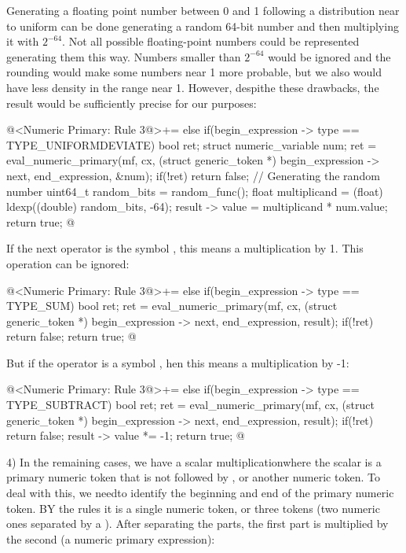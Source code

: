 Generating a floating point number between 0 and 1 following a
distribution near to uniform can be done generating a random 64-bit
number and then multiplying it with $2^{-64}$. Not all possible
floating-point numbers could be represented generating them this
way. Numbers smaller than $2^{-64}$ would be ignored and the rounding
would make some numbers near 1 more probable, but we also would have
less density in the range near 1. However, despithe these drawbacks,
the result would be sufficiently precise for our purposes:

\iniciocodigo
@<Numeric Primary: Rule 3@>+=
else if(begin_expression -> type == TYPE_UNIFORMDEVIATE){
  bool ret;
  struct numeric_variable num;
  ret = eval_numeric_primary(mf, cx, (struct generic_token *)
                             begin_expression -> next,
                             end_expression, &num);
  if(!ret)
    return false;
  { // Generating the random number
    uint64_t random_bits = random_func();
    float multiplicand = (float) ldexp((double) random_bits, -64);
    result -> value = multiplicand * num.value;
  }
  return true;
}
@
\fimcodigo

If the next operator is the symbol \monoespaco{+}, this means a
multiplication by 1. This operation can be ignored:

\iniciocodigo
@<Numeric Primary: Rule 3@>+=
else if(begin_expression -> type == TYPE_SUM){
  bool ret;
  ret = eval_numeric_primary(mf, cx, (struct generic_token *)
                             begin_expression -> next,
                             end_expression, result);
  if(!ret)
    return false;
  return true;
}
@
\fimcodigo

But if the operator is a symbol \monoespaco{-}, hen this means a
multiplication by -1:

\iniciocodigo
@<Numeric Primary: Rule 3@>+=
else if(begin_expression -> type == TYPE_SUBTRACT){
  bool ret;
  ret = eval_numeric_primary(mf, cx, (struct generic_token *)
                             begin_expression -> next,
                             end_expression, result);
  if(!ret)
    return false;
  result -> value *= -1;
  return true;
}
@
\fimcodigo

4) In the remaining cases, we have a scalar multiplicationwhere the
scalar is a primary numeric token that is not followed
by \monoespaco{+}, \monoespaco{-} or another numeric token. To deal
with this, we needto identify the beginning and end of the primary
numeric token. BY the rules it is a single numeric token, or three
tokens (two numeric ones separated by a \monoespaco{/}). After
separating the parts, the first part is multiplied by the second (a
numeric primary expression):

